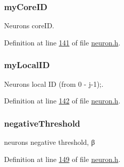 \subsubsection[{my\+Core\+I\+D}]{ my\+Core\+I\+D}\label{structneuron_state_a76ef99e5766b6e36c3f41a2920e8c56c}


Neuron\textquotesingle{}s core\+I\+D. 



Definition at line \hyperlink{neuron_8h_source_l00141}{141} of file \hyperlink{neuron_8h_source}{neuron.\+h}.

\hypertarget{structneuron_state_ac24762c24aede292a2ce5df78114881c}{}
\subsubsection[{my\+Local\+I\+D}]{ my\+Local\+I\+D}\label{structneuron_state_ac24762c24aede292a2ce5df78114881c}


Neuron\textquotesingle{}s local I\+D (from 0 -\/ j-\/1);. 



Definition at line \hyperlink{neuron_8h_source_l00142}{142} of file \hyperlink{neuron_8h_source}{neuron.\+h}.

\hypertarget{structneuron_state_a678bcd9f031e290178cd5d2855e74279}{}
\subsubsection[{negative\+Threshold}]{ negative\+Threshold}\label{structneuron_state_a678bcd9f031e290178cd5d2855e74279}


neuron\textquotesingle{}s negative threshold, β 



Definition at line \hyperlink{neuron_8h_source_l00149}{149} of file \hyperlink{neuron_8h_source}{neuron.\+h}.

\hypertarget{structneuron_state_a3ec480684e7a2cfc67a8ef7ac1bf57b9}{}
